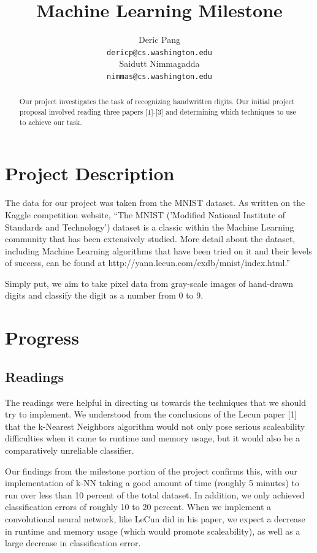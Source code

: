 \documentclass{article} %
\title{Machine Learning Milestone}
\author{
Deric Pang \\
\texttt{dericp@cs.washington.edu} \\
\And
Saidutt Nimmagadda \\
\texttt{nimmas@cs.washington.edu} \\
}
\begin{document}
\maketitle

\begin{abstract}
Our project investigates the task of recognizing handwritten digits. Our initial
project proposal involved reading three papers [1]-[3] and determining which
techniques to use to achieve our task.
\end{abstract}

\section{Project Description}

The data for our project was taken from the MNIST dataset. As written on the
Kaggle competition website, ``The MNIST
('Modified National Institute of Standards and Technology') dataset
is a classic within the Machine Learning community that has been extensively
studied. More detail about the dataset, including Machine Learning algorithms
that have been tried on it and their levels of success, can be found at
http://yann.lecun.com/exdb/mnist/index.html.''

Simply put, we aim to take pixel data from gray-scale images of hand-drawn digits
and classify the digit as a number from 0 to 9.

\section{Progress}

\subsection{Readings}
The readings were helpful in directing us towards the techniques that we should
try to implement. We understood from the
conclusions of the Lecun paper [1] that the k-Nearest Neighbors algorithm would not
only pose serious scaleability difficulties when it came to runtime and memory
usage, but it would also be a comparatively unreliable classifier.

Our findings from the milestone portion of the project confirms this, with our implementation
of k-NN taking a good amount of time (roughly 5 minutes) to run over less than
10 percent of the total dataset. In addition, we only achieved classification
errors of roughly 10 
to 20 percent. When we implement a convolutional neural network, like LeCun did
in his paper, we expect a decrease in runtime and memory usage (which
would promote scaleability), as well as a large decrease in classification error.
\end{document}
